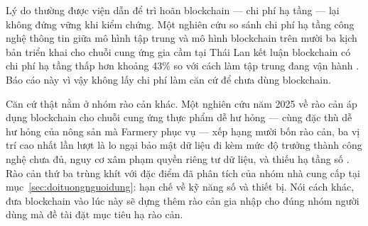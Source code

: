 Lý do thường được viện dẫn để trì hoãn blockchain --- chi phí hạ tầng --- lại không đứng vững khi kiểm chứng. Một nghiên cứu so sánh chi phí hạ tầng công nghệ thông tin giữa mô hình tập trung và mô hình blockchain trên mười ba kịch bản triển khai cho chuỗi cung ứng gia cầm tại Thái Lan kết luận blockchain có chi phí hạ tầng thấp hơn khoảng 43\% so với cách làm tập trung đang vận hành \parencite{thai_broiler_blockchain_2025}. Báo cáo này vì vậy không lấy chi phí làm căn cứ để chưa dùng blockchain.

Căn cứ thật nằm ở nhóm rào cản khác. Một nghiên cứu năm 2025 về rào cản áp dụng blockchain cho chuỗi cung ứng thực phẩm dễ hư hỏng --- cùng đặc thù dễ hư hỏng của nông sản mà Farmery phục vụ --- xếp hạng mười bốn rào cản, ba vị trí cao nhất lần lượt là lo ngại bảo mật dữ liệu đi kèm mức độ trưởng thành công nghệ chưa đủ, nguy cơ xâm phạm quyền riêng tư dữ liệu, và thiếu hạ tầng số \parencite{perishable_blockchain_barriers_2025}. Rào cản thứ ba trùng khít với đặc điểm đã phân tích của nhóm nhà cung cấp tại mục~\ref{sec:doituongnguoidung}: hạn chế về kỹ năng số và thiết bị. Nói cách khác, đưa blockchain vào lúc này sẽ dựng thêm rào cản gia nhập cho đúng nhóm người dùng mà đề tài đặt mục tiêu hạ rào cản.

